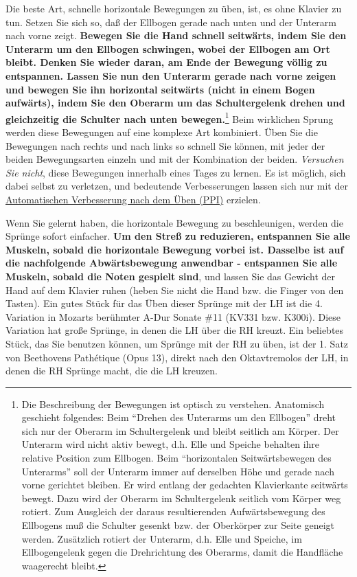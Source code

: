 Die beste Art, schnelle horizontale Bewegungen zu üben, ist, es ohne Klavier zu tun.
Setzen Sie sich so, daß der Ellbogen gerade nach unten und der Unterarm nach vorne zeigt.
\textbf{Bewegen Sie die Hand schnell seitwärts, indem Sie den Unterarm um den Ellbogen schwingen, wobei der Ellbogen am Ort bleibt.
Denken Sie wieder daran, am Ende der Bewegung völlig zu entspannen.
Lassen Sie nun den Unterarm gerade nach vorne zeigen und bewegen Sie ihn horizontal seitwärts (nicht in einem Bogen aufwärts), indem Sie den Oberarm um das Schultergelenk drehen und gleichzeitig die Schulter nach unten bewegen.}\footnote{Die Beschreibung der Bewegungen ist optisch zu verstehen.
Anatomisch geschieht folgendes:
Beim \enquote{Drehen des Unterarms um den Ellbogen} dreht sich nur der Oberarm im Schultergelenk und bleibt seitlich am Körper.
Der Unterarm wird nicht aktiv bewegt, d.h. Elle und Speiche behalten ihre relative Position zum Ellbogen.
Beim \enquote{horizontalen Seitwärtsbewegen des Unterarms} soll der Unterarm immer auf derselben Höhe und gerade nach vorne gerichtet bleiben.
Er wird entlang der gedachten Klavierkante seitwärts bewegt.
Dazu wird der Oberarm im Schultergelenk seitlich vom Körper weg rotiert.
Zum Ausgleich der daraus resultierenden Aufwärtsbewegung des Ellbogens muß die Schulter gesenkt bzw. der Oberkörper zur Seite geneigt werden.
Zusätzlich rotiert der Unterarm, d.h. Elle und Speiche, im Ellbogengelenk gegen die Drehrichtung des Oberarms, damit die Handfläche waagerecht bleibt.}
Beim wirklichen Sprung werden diese Bewegungen auf eine komplexe Art kombiniert.
Üben Sie die Bewegungen nach rechts und nach links so schnell Sie können, mit jeder der beiden Bewegungsarten einzeln und mit der Kombination der beiden.
\textit{Versuchen Sie nicht}, diese Bewegungen innerhalb eines Tages zu lernen.
Es ist möglich, sich dabei selbst zu verletzen, und bedeutende Verbesserungen lassen sich nur mit der \hyperlink{c1ii15}{Automatischen Verbesserung nach dem Üben (PPI)} erzielen.

Wenn Sie gelernt haben, die horizontale Bewegung zu beschleunigen, werden die Sprünge sofort einfacher.
\textbf{Um den Streß zu reduzieren, entspannen Sie alle Muskeln, sobald die horizontale Bewegung vorbei ist.
Dasselbe ist auf die nachfolgende Abwärtsbewegung anwendbar - entspannen Sie alle Muskeln, sobald die Noten gespielt sind}, und lassen Sie das Gewicht der Hand auf dem Klavier ruhen (heben Sie nicht die Hand bzw. die Finger von den Tasten).
Ein gutes Stück für das Üben dieser Sprünge mit der LH ist die 4. Variation in Mozarts berühmter A-Dur Sonate \#11 (KV331 bzw. K300i).
Diese Variation hat große Sprünge, in denen die LH über die RH kreuzt.
Ein beliebtes Stück, das Sie benutzen können, um Sprünge mit der RH zu üben, ist der 1. Satz von Beethovens Pathétique (Opus 13), direkt nach den Oktavtremolos der LH, in denen die RH Sprünge macht, die die LH kreuzen.

